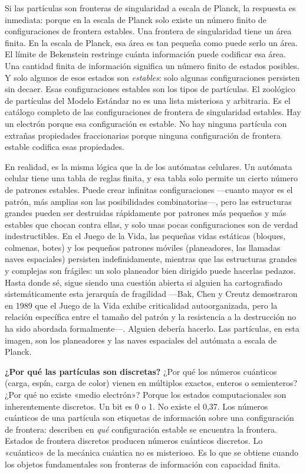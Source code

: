 \documentclass[11pt, twoside, openright]{book}
\begin{document}
Si las partículas son fronteras de singularidad a escala de Planck, la respuesta es inmediata: porque en la escala de Planck solo existe un número finito de configuraciones de frontera estables. Una frontera de singularidad tiene un área finita. En la escala de Planck, esa área es tan pequeña como puede serlo un área. El límite de Bekenstein restringe cuánta información puede codificar esa área. Una cantidad finita de información significa un número finito de estados posibles. Y solo algunos de esos estados son \textit{estables}: solo algunas configuraciones persisten sin decaer. Esas configuraciones estables son los tipos de partículas. El zoológico de partículas del Modelo Estándar no es una lista misteriosa y arbitraria. Es el catálogo completo de las configuraciones de frontera de singularidad estables. Hay un electrón porque esa configuración es estable. No hay ninguna partícula con extrañas propiedades fraccionarias porque ninguna configuración de frontera estable codifica esas propiedades.

En realidad, es la misma lógica que la de los autómatas celulares. Un autómata celular tiene una tabla de reglas finita, y esa tabla solo permite un cierto número de patrones estables. Puede crear infinitas configuraciones ---cuanto mayor es el patrón, más amplias son las posibilidades combinatorias---, pero las estructuras grandes pueden ser destruidas rápidamente por patrones más pequeños y más estables que chocan contra ellas, y solo unas pocas configuraciones son de verdad indestructibles. En el Juego de la Vida, las pequeñas vidas estáticas (bloques, colmenas, botes) y los pequeños patrones móviles (planeadores, las llamadas naves espaciales) persisten indefinidamente, mientras que las estructuras grandes y complejas son frágiles: un solo planeador bien dirigido puede hacerlas pedazos. Hasta donde sé, sigue siendo una cuestión abierta si alguien ha cartografiado sistemáticamente esta jerarquía de fragilidad ---Bak, Chen y Creutz demostraron en 1989 que el Juego de la Vida exhibe criticalidad autoorganizada, pero la relación específica entre el tamaño del patrón y la resistencia a la destrucción no ha sido abordada formalmente---. Alguien debería hacerlo. Las partículas, en esta imagen, son los planeadores y las naves espaciales del autómata a escala de Planck.

\textbf{¿Por qué las partículas son discretas?} ¿Por qué los números cuánticos (carga, espín, carga de color) vienen en múltiplos exactos, enteros o semienteros? ¿Por qué no existe «medio electrón»? Porque los estados computacionales son inherentemente discretos. Un bit es 0 o 1. No existe el 0,37. Los números cuánticos de una partícula son etiquetas de información sobre una configuración de frontera: describen en \textit{qué} configuración estable se encuentra la frontera. Estados de frontera discretos producen números cuánticos discretos. Lo «cuántico» de la mecánica cuántica no es misterioso. Es lo que se obtiene cuando los objetos fundamentales son fronteras de información con capacidad finita.
\end{document}
